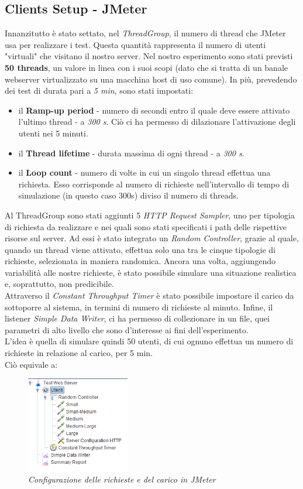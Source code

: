 \subsection{Clients Setup - JMeter}
Innanzitutto è stato settato, nel \textit{ThreadGroup}, il numero di thread che JMeter usa per realizzare i test. Questa quantità rappresenta il numero di utenti "virtuali" che visitano il nostro server. Nel nostro esperimento sono stati previsti \textbf{50 threads}, un valore in linea con i suoi scopi (dato che si tratta di un banale webserver virtualizzato su una macchina host di uso comune). In più, prevedendo dei test di durata pari a \textit{5 min}, sono stati impostati:
\begin{itemize}
	\item il \textbf{Ramp-up period} - numero di secondi entro il quale deve essere attivato l'ultimo thread - a \textit{300 s}. Ciò ci ha permesso di dilazionare l'attivazione degli utenti nei 5 minuti.
	\item il \textbf{Thread lifetime} - durata massima di ogni thread - a \textit{300 s}.
	\item il \textbf{Loop count} - numero di volte in cui un singolo thread effettua una richiesta. Esso corrisponde al numero di richieste nell'intervallo di tempo di simulazione (in questo caso 300s) diviso il numero di threads.
\end{itemize}
Al ThreadGroup sono stati aggiunti 5 \textit{HTTP Request Sampler}, uno per tipologia di richiesta da realizzare e nei quali sono stati specificati i path delle rispettive risorse sul server. Ad essi è stato integrato un \textit{Random Controller}, grazie al quale, quando un thread viene attivato, effettua solo una tra le cinque tipologie di richieste, selezionata in maniera randomica. Ancora una volta, aggiungendo variabilità alle nostre richieste, è stato possibile simulare una situazione realistica e, soprattutto, non predicibile.
\\
Attraverso il \textit{Constant Throughput Timer} è stato possibile impostare il carico da sottoporre al sistema, in termini di numero di richieste al minuto. Infine, il listener \textit{Simple Data Writer}, ci ha permesso di collezionare in un file, quei parametri di alto livello che sono d'interesse ai fini dell'esperimento.
\\L'idea è quella di simulare quindi 50 utenti, di cui ognuno effettua un numero di richieste in relazione al carico, per 5 min. \\Ciò equivale a:
\begin{figure}[H]
	\centering
	\includegraphics[width=0.4\textwidth]{img/hw2/jmeter.png}
	\caption{\textit{Configurazione delle richieste e del carico in JMeter}}
\end{figure}
